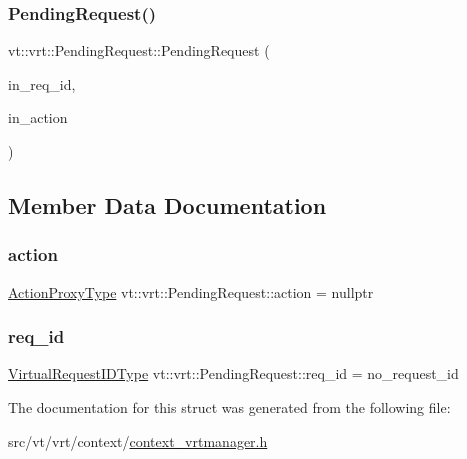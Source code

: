 \subsubsection{\texorpdfstring{Pending\+Request()}{PendingRequest()}}
{\footnotesize\ttfamily vt\+::vrt\+::\+Pending\+Request\+::\+Pending\+Request (\begin{DoxyParamCaption}\item[{\hyperlink{namespacevt_1_1vrt_ac7ef8820ebfc383fa16f09bf46eaa2b8}{Virtual\+Request\+I\+D\+Type} const \&}]{in\+\_\+req\+\_\+id,  }\item[{\hyperlink{namespacevt_a102aa105d64254d89f7e585d106c95aa}{Action\+Proxy\+Type}}]{in\+\_\+action }\end{DoxyParamCaption})\hspace{0.3cm}{\ttfamily [inline]}}



\subsection{Member Data Documentation}
\mbox{\label{structvt_1_1vrt_1_1_pending_request_af6fddf631eb75dd7045f14ce76e30178}} 
\subsubsection{\texorpdfstring{action}{action}}
{\footnotesize\ttfamily \hyperlink{namespacevt_a102aa105d64254d89f7e585d106c95aa}{Action\+Proxy\+Type} vt\+::vrt\+::\+Pending\+Request\+::action = nullptr}

\mbox{\label{structvt_1_1vrt_1_1_pending_request_a6b50fb651ed1f7f7a38220543b79f968}} 
\subsubsection{\texorpdfstring{req\+\_\+id}{req\_id}}
{\footnotesize\ttfamily \hyperlink{namespacevt_1_1vrt_ac7ef8820ebfc383fa16f09bf46eaa2b8}{Virtual\+Request\+I\+D\+Type} vt\+::vrt\+::\+Pending\+Request\+::req\+\_\+id = no\+\_\+request\+\_\+id}



The documentation for this struct was generated from the following file\+:\begin{DoxyCompactItemize}
\item 
src/vt/vrt/context/\hyperlink{context__vrtmanager_8h}{context\+\_\+vrtmanager.\+h}\end{DoxyCompactItemize}
